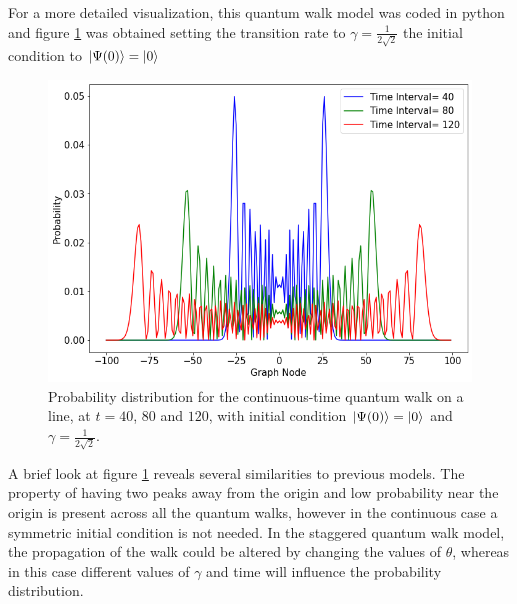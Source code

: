 \documentclass[../../dissertation.tex]{subfiles}
\begin{document}
For a more detailed visualization, this quantum walk model was coded in python
and figure \ref{fig:contdist0} was obtained setting the transition rate to
$\gamma=\frac{1}{2\sqrt{2}}$ the initial condition to $\ket{\Psi(0)} = \ket{0}$ 
\begin{figure}[!h]
	\centering
	\includegraphics[scale=0.40]{img/ContQuantumWalk/ctqwMultipleTime.png}
	\caption{Probability distribution for the continuous-time quantum walk on a line, at $t=40$, $80$ and $120$, with initial condition $\ket{\Psi(0)}=\ket{0}$ and $\gamma=\frac{1}{2\sqrt{2}}$.} 
	\label{fig:contdist0}
\end{figure}
A brief look at figure \ref{fig:contdist0} reveals several similarities to
previous models. The property of having two peaks away from the origin and low
probability near the origin is present across all the quantum walks, however in
the continuous case a symmetric initial condition is not needed. In the
staggered quantum walk model, the propagation of the walk could be altered by
changing the values of $\theta$, whereas in this case different values of
$\gamma$ and time will influence the probability distribution.\par
\end{document}

